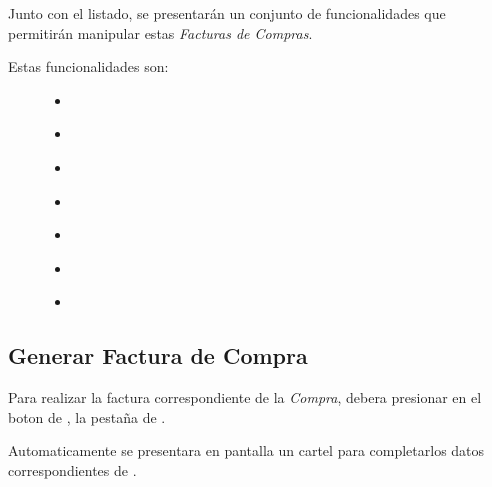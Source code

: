 \documentclass[a4paper,10pt,spanish]{sphinxmanual}
\begin{document}
Junto con el listado, se presentarán un conjunto de funcionalidades que permitirán manipular estas \emph{Facturas de Compras}.
\begin{description}
\item[{Estas funcionalidades son:}] \leavevmode\begin{itemize}
\item {} 

\item {} 
{\hyperref[compras:ver\string-facturados]{}}

\item {} 
{\hyperref[compras:cancelar\string-pago]{}}

\item {} 
{\hyperref[compras:ver\string-detalle\string-pago]{}}

\item {} 
{\hyperref[ventas:reportes]{}}

\item {} 
{\hyperref[ventas:formulario\string-busqueda\string-ventas]{}}

\item {} 
{\hyperref[ventas:formulario\string-busqueda\string-factemit]{}}

\end{itemize}

\end{description}


\subsection{Generar Factura de Compra}
\label{compras:generar-factura-compra}\label{compras:generar-factura-de-compra}
Para realizar la factura correspondiente de la \emph{Compra}, debera presionar en el boton de , la pestaña de .


Automaticamente se presentara en pantalla un cartel para completarlos datos correspondientes de .
\end{document}
